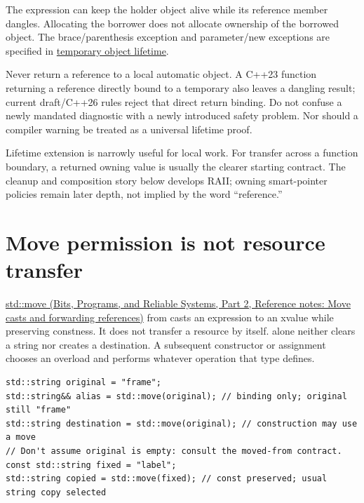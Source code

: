 The  expression can keep the holder object alive while its reference member dangles. Allocating the borrower does not allocate ownership of the borrowed object. The brace/parenthesis exception and parameter/new exceptions are specified in \href{https://eel.is/c++draft/class.temporary}{temporary object lifetime}.

Never return a reference to a local automatic object. A C++23 function returning a reference directly bound to a temporary also leaves a dangling result; current draft/C++26 rules reject that direct return binding. Do not confuse a newly mandated diagnostic with a newly introduced safety problem. Nor should a compiler warning be treated as a universal lifetime proof.

Lifetime extension is narrowly useful for local work. For transfer across a function boundary, a returned owning value is usually the clearer starting contract. The cleanup and composition story below develops RAII; owning smart-pointer policies remain later depth, not implied by the word ``reference.''

\section{Move permission is not resource transfer}\label{05-engine-i-ch003-move-permission-is-not-resource-transfer}

\hypertarget{05-engine-i-ch003-move-permission-is-not-resource-transfer}{}

\href{../01-Bits-Programs-and-Reliable-Systems-P02/main.pdf\#nameddest=appendix-0104b704fb11}{std::move (Bits, Programs, and Reliable Systems, Part 2, Reference notes: Move casts and forwarding references)} from  casts an expression to an xvalue while preserving constness. It does not transfer a resource by itself.  alone neither clears a string nor creates a destination. A subsequent constructor or assignment chooses an overload and performs whatever operation that type defines.

\begin{verbatim}
std::string original = "frame";
std::string&& alias = std::move(original); // binding only; original still "frame"
std::string destination = std::move(original); // construction may use a move
// Don't assume original is empty: consult the moved-from contract.
const std::string fixed = "label";
std::string copied = std::move(fixed); // const preserved; usual string copy selected
\end{verbatim}

